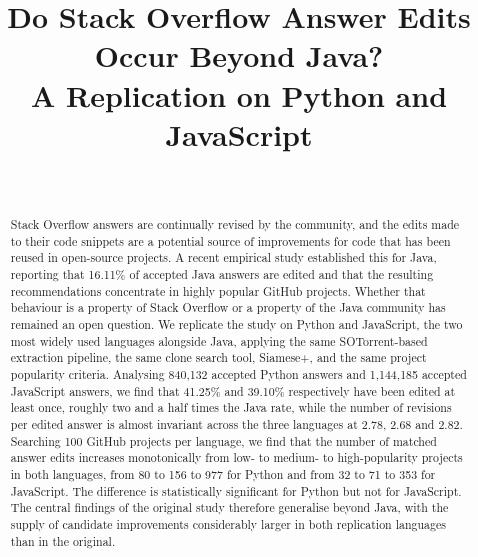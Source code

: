 \documentclass[onecolumn,11pt]{IEEEtran}
\begin{document}
\title{Do Stack Overflow Answer Edits Occur Beyond Java?\\
A Replication on Python and JavaScript}

\author{\\
\bigskip
{}}

\maketitle

\begin{abstract} 
Stack Overflow answers are continually revised by the community, and the edits made to their code snippets are a potential source of improvements for code that has been reused in open-source projects.
A recent empirical study established this for Java, reporting that 16.11\% of accepted Java answers are edited and that the resulting recommendations concentrate in highly popular GitHub projects.
Whether that behaviour is a property of Stack Overflow or a property of the Java community has remained an open question.
We replicate the study on Python and JavaScript, the two most widely used languages alongside Java, applying the same SOTorrent-based extraction pipeline, the same clone search tool, Siamese+, and the same project popularity criteria.
Analysing 840{,}132 accepted Python answers and 1{,}144{,}185 accepted JavaScript answers, we find that 41.25\% and 39.10\% respectively have been edited at least once, roughly two and a half times the Java rate, while the number of revisions per edited answer is almost invariant across the three languages at 2.78, 2.68 and 2.82.
Searching 100 GitHub projects per language, we find that the number of matched answer edits increases monotonically from low- to medium- to high-popularity projects in both languages, from 80 to 156 to 977 for Python and from 32 to 71 to 353 for JavaScript.
The difference is statistically significant for Python but not for JavaScript.
The central findings of the original study therefore generalise beyond Java, with the supply of candidate improvements considerably larger in both replication languages than in the original.
\end{abstract}
\end{document}
